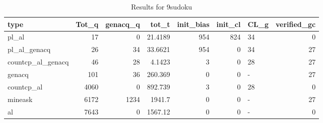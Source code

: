 \begin{table}[ht]
\caption{Results for 9sudoku}
\begin{tabular}{lrrrrrlr}
\hline
 type              &   Tot\_q &   genacq\_q &     tot\_t &   init\_bias &   init\_cl & CL\_g   &   verified\_gc \\
\hline
 pl\_al             &      17 &          0 &   21.4189 &         954 &       824 & 34     &             0 \\
 pl\_al\_genacq      &      26 &         34 &   33.6621 &         954 &         0 & 34     &            27 \\
 countcp\_al\_genacq &      46 &         28 &    4.1423 &           3 &         0 & 28     &            27 \\
 genacq            &     101 &         36 &  260.369  &           0 &         0 & -      &            27 \\
 countcp\_al        &    4060 &          0 &  892.739  &           3 &         0 & 28     &             0 \\
 mineask           &    6172 &       1234 & 1941.7    &           0 &         0 & -      &            27 \\
 al                &    7643 &          0 & 1567.12   &           0 &         0 & -      &             0 \\
\hline
\end{tabular}
\end{table}